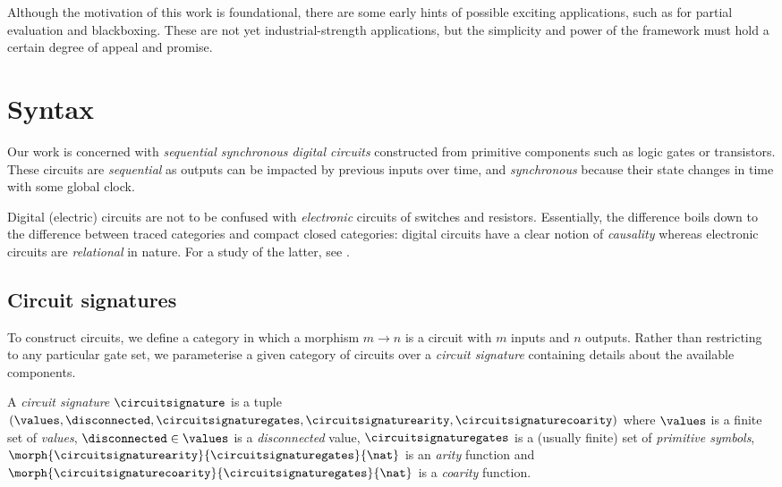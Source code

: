 \documentclass{lmcs}
\begin{document}
Although the motivation of this work is foundational, there are some early
hints of possible exciting applications, such as for partial evaluation and
blackboxing.
These are not yet industrial-strength applications, but the simplicity and
power of the framework must hold a certain degree of appeal and promise.

\section{Syntax}

Our work is concerned with \emph{sequential synchronous digital circuits}
constructed from primitive components such as logic gates or transistors.
These circuits are \emph{sequential} as outputs can be impacted by previous
inputs over time, and \emph{synchronous} because their state changes in time
with some global clock.

\begin{rem}
    Digital (electric) circuits are not to be confused with \emph{electronic}
    circuits of switches and resistors.
    Essentially, the difference boils down to the difference between traced
    categories and compact closed categories: digital circuits have a clear
    notion of \emph{causality} whereas electronic circuits are \emph{relational}
    in nature.
    For a study of the latter, see \cite{boisseau2022string}.
\end{rem}

\subsection{Circuit signatures}

To construct circuits, we define a category in which a morphism
\(m \to n\) is a circuit with \(m\) inputs and \(n\) outputs.
Rather than restricting to any particular gate set, we parameterise a given
category of circuits over a \emph{circuit signature} containing details about
the available components.

\begin{defi}
    A \emph{circuit signature} \(\circuitsignature\) is a tuple \((
    \values,
    \disconnected,
    \circuitsignaturegates,
    \circuitsignaturearity,
    \circuitsignaturecoarity
    )\) where \(\values\) is a finite set of \emph{values}, \(
    \disconnected \in \values
    \) is a \emph{disconnected} value, \(\circuitsignaturegates\) is a (usually
    finite) set of \emph{primitive symbols}, \(
    \morph{\circuitsignaturearity}{\circuitsignaturegates}{\nat}
    \) is an \emph{arity} function and \(
    \morph{\circuitsignaturecoarity}{\circuitsignaturegates}{\nat}
    \) is a \emph{coarity} function.
\end{defi}
\end{document}
